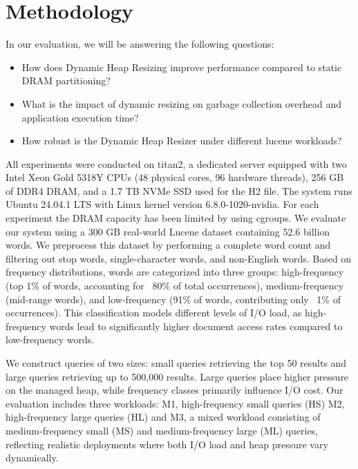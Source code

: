 \section{Methodology}
In our evaluation, we will be answering the following questions:

\begin{itemize}
\item How does Dynamic Heap Resizing improve performance compared to static DRAM partitioning?
\item What is the impact of dynamic resizing on garbage collection overhead and application execution time?
\item How robust is the Dynamic Heap Resizer under different lucene workloads?
\end{itemize}

All experiments were conducted on titan2, a dedicated server equipped with two Intel Xeon Gold 5318Y CPUs (48 physical cores, 96 hardware threads), 256 GB of DDR4 DRAM, and a 1.7 TB NVMe SSD used for the H2 file. The system runs Ubuntu 24.04.1 LTS with Linux kernel version 6.8.0-1020-nvidia. For each experiment the DRAM capacity has been limited by using cgroups.
We evaluate our system using a 300 GB real-world Lucene dataset containing 52.6 billion words. We preprocess this dataset by performing a complete word count and filtering out stop words, single-character words, and non-English words. Based on frequency distributions, words are categorized into three groups: high-frequency (top 1\% of words, accounting for ~80\% of total occurrences), medium-frequency (mid-range words), and low-frequency (91\% of words, contributing only ~1\% of occurrences). This classification models different levels of I/O load, as high-frequency words lead to significantly higher document access rates compared to low-frequency words.

We construct queries of two sizes: small queries retrieving the top 50 results and large queries retrieving up to 500,000 results. Large queries place higher pressure on the managed heap, while frequency classes primarily influence I/O cost. Our evaluation includes three workloads:
M1, high-frequency small queries (HS)
M2, high-frequency large queries (HL) and
M3, a mixed workload consisting of medium-frequency small (MS) and medium-frequency large (ML) queries, reflecting realistic deployments where both I/O load and heap pressure vary dynamically.

